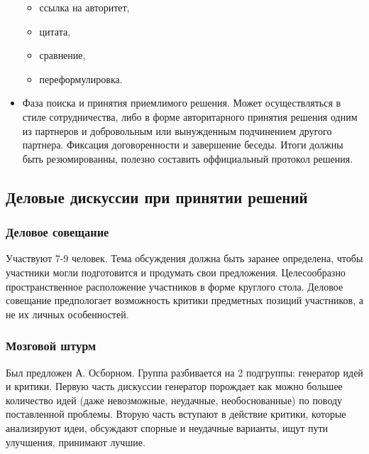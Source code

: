 \begin{itemize}
		\begin{itemize}
			\item ссылка на авторитет,
			\item цитата,
			\item сравнение,
			\item переформулировка.
		\end{itemize}
	\item Фаза поиска и принятия приемлимого решения. Может осуществляться в стиле сотрудничества, либо в форме авторитарного принятия решения одним из партнеров и добровольным или вынужденным подчинением другого партнера. Фиксация договоренности и завершение беседы. Итоги должны быть резюмированны, полезно составить оффициальный протокол решения.
\end{itemize}

\subsection{Деловые дискуссии при принятии решений}
\subsubsection{Деловое совещание}
Участвуют 7-9 человек. Тема обсуждения должна быть заранее определена, чтобы участники могли подготовится и продумать свои предложения. Целесообразно пространственное расположение участников в форме круглого стола. Деловое совещание предпологает возможность критики предметных позиций участников, а не их личных особенностей.
\subsubsection{Мозговой штурм}
Был предложен А. Осборном. Группа разбивается на 2 подгруппы: генератор идей и критики. Первую часть дискуссии генератор порождает как можно большее количество идей (даже невозможные, неудачные, необоснованные) по поводу поставленной проблемы. Вторую часть вступают в действие критики, которые анализируют идеи, обсуждают спорные и неудачные варианты, ищут пути улучшения, принимают лучшие.
